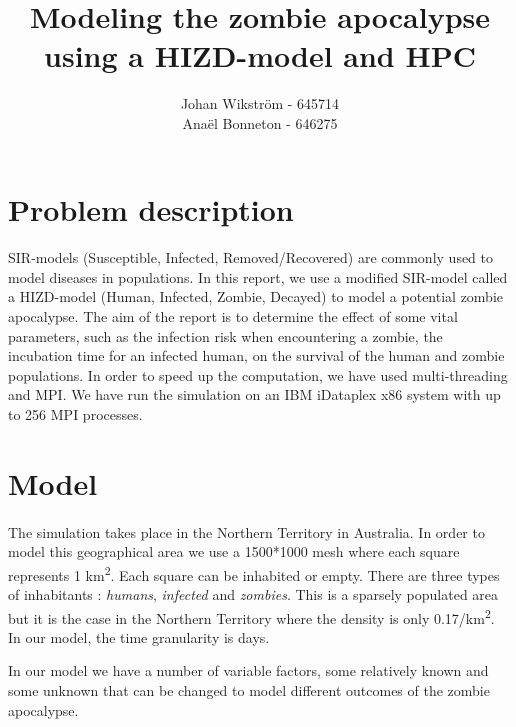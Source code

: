 \documentclass{article}
\title{Modeling the zombie apocalypse using a HIZD-model and HPC}
\author{Johan Wikström - 645714 \\
        Anaël Bonneton - 646275}
\begin{document}
\maketitle
\tableofcontents

\newpage

\section{Problem description}	

\paragraph{}
SIR-models (Susceptible, Infected, Removed/Recovered) are commonly used to model diseases in populations. In this report, we use a modified SIR-model called a HIZD-model (Human, Infected, Zombie, Decayed) to model a potential zombie apocalypse. The aim of the report is to determine the effect of some vital parameters, such as the infection risk when encountering a zombie, the incubation time for an infected human, on the survival of the human and zombie populations. In order to speed up the computation, we have used multi-threading and MPI\cite{openmpi}. We have run the simulation on an IBM iDataplex x86 system with up to 256 MPI processes.

\section{Model}

\paragraph{}
The simulation takes place in the Northern Territory in Australia. In order to model this geographical area we use a 1500*1000 mesh where each square represents 1 km\textsuperscript{2}. Each square can be inhabited or empty. There are three types of inhabitants : \emph{humans}, \emph{infected} and \emph{zombies}. This is a sparsely populated area but it is the case in the Northern Territory where the density is only 0.17/km\textsuperscript{2}. In our model, the time granularity is days. 

In our model we have a number of variable factors, some relatively known and some unknown that can be changed to model different outcomes of the zombie apocalypse.
\end{document}
